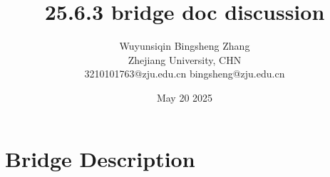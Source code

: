 \documentclass{article}
\title{25.6.3 bridge doc discussion}
\author{Wuyunsiqin \quad \quad Bingsheng Zhang \\ 
Zhejiang University, CHN \\
3210101763@zju.edu.cn \quad bingsheng@zju.edu.cn}
\date{May 20 2025}
\begin{document}
\maketitle

\section{Bridge Description}








\end{document}
